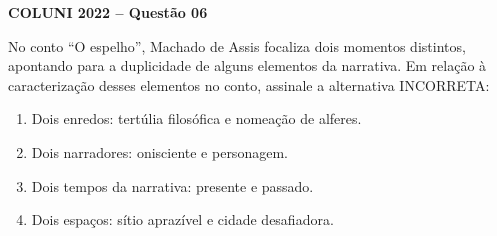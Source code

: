 \textbf{COLUNI 2022 -- Questão 06}\par\medskip No conto “O espelho”, Machado de Assis focaliza dois momentos distintos, apontando para a duplicidade de alguns elementos da narrativa. Em relação à caracterização desses elementos no conto, assinale a alternativa INCORRETA:\begin{enumerate}
\item Dois enredos: tertúlia filosófica e nomeação de alferes.
\item Dois narradores: onisciente e personagem.
\item Dois tempos da narrativa: presente e passado.
\item Dois espaços: sítio aprazível e cidade desafiadora.\end{enumerate}
